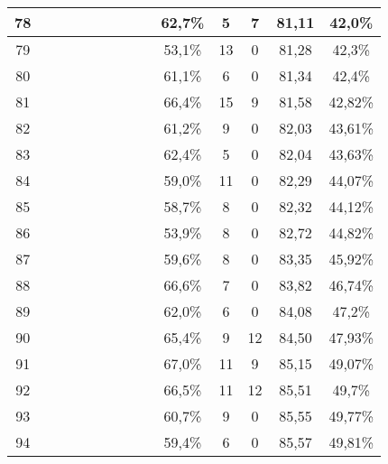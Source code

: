 \begin{longtable}{|c|c|c|c|c|c|c|c|c|c|c|c|c|c|}
78  &  \x    & \x    & \x    & \x    & \x    & \x\m  &       & \x    & 62,7\% &  5  & 7  & 81,11 & 42,0\% \\ \hline
79  &  \x    & \x    &       &       &       &       &       &       & 53,1\% &  13 & 0  & 81,28 & 42,3\% \\ \hline
80  &  \x    & \x    & \x    & \x    &       & \x    &       & \x    & 61,1\% &  6  & 0  & 81,34 & 42,4\% \\ \hline
81  &  \x    & \x    &       &       & \x\m  & \x\m  &       & \x\m  & 66,4\% &  15 & 9  & 81,58 & 42,82\% \\ \hline
82  &  \x    & \x    & \x    & \x    &       &       &       & \x\m  & 61,2\% &  9  & 0  & 82,03 & 43,61\% \\ \hline
83  &  \x    & \x    & \x    &       & \x    & \x\m  & \x    &       & 62,4\% &  5  & 0  & 82,04 & 43,63\% \\ \hline
84  &  \x    & \x    &       & \x    & \x    &       &       &       & 59,0\% &  11 & 0  & 82,29 & 44,07\% \\ \hline
85  &  \x    & \x    & \x    &       &       & \x\m  &       &       & 58,7\% &  8  & 0  & 82,32 & 44,12\% \\ \hline
86  &  \x    & \x    &       & \x    &       &       &       &       & 53,9\% &  8  & 0  & 82,72 & 44,82\% \\ \hline
87  &  \x    & \x    &       &       & \x    &       &       &       & 59,6\% &  8  & 0  & 83,35 & 45,92\% \\ \hline
88  &  \x    & \x    & \x    &       & \x\m  &       & \x    &       & 66,6\% &  7  & 0  & 83,82 & 46,74\% \\ \hline
89  &  \x    & \x    & \x    &       & \x    & \x\m  &       & \x    & 62,0\% &  6  & 0  & 84,08 & 47,2\% \\ \hline
90  &  \x    & \x    &       & \x    & \x\m  & \x\m  & \x\m  &       & 65,4\% &  9  & 12 & 84,50 & 47,93\% \\ \hline
91  &  \x    & \x    &       &       & \x\m  & \x\m  &       &       & 67,0\% &  11 & 9  & 85,15 & 49,07\% \\ \hline
92  &  \x    & \x    &       & \x    & \x\m  &       &       & \x\m  & 66,5\% &  11 & 12 & 85,51 & 49,7\% \\ \hline
93  &  \x    & \x    & \x    &       &       &       & \x    &       & 60,7\% &  9  & 0  & 85,55 & 49,77\% \\ \hline
94  &  \x    & \x    & \x    &       &       & \x    &       & \x    & 59,4\% &  6  & 0  & 85,57 & 49,81\% \\ \hline

\end{longtable}
